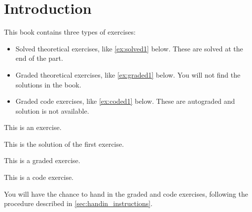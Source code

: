 

\section{Introduction}



This book contains three types of exercises:


\begin{itemize}

  \item Solved theoretical exercises, like \cref{ex:solved1} below. These are solved at the end of the part.
  \item Graded theoretical exercises, like \cref{ex:graded1} below. You will not find the solutions in the book.
  \item Graded code exercises, like \cref{ex:coded1} below. These are autograded and solution is not available.
\end{itemize}


\begin{exercise}
  \label{ex:solved1} This is an exercise.
\end{exercise}
\begin{solution}
  This is the solution of the first exercise.
\end{solution}

\begin{gradedexercise}
  \label{ex:graded1} This is a graded exercise.
\end{gradedexercise}

\begin{codeexercise}
  \label{ex:coded1}
  This is a code exercise.
\end{codeexercise}

You will have the chance to hand in the graded and code exercises, following the procedure described in \cref{sec:handin_instructions}.